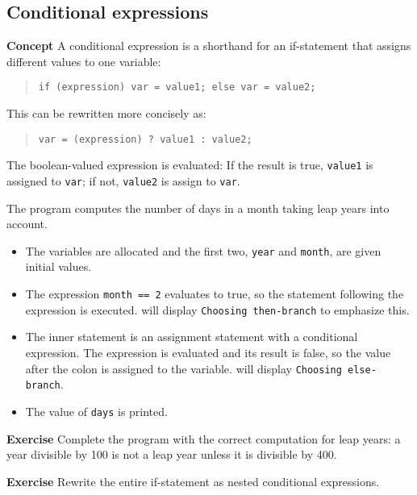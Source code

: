 \subsection{Conditional expressions}\label{control.02}

\textbf{Concept} A conditional expression is a shorthand for an if-statement that
assigns different values to one variable:
\begin{quote}
\texttt{if (expression) var = value1; else var = value2;}
\end{quote}
This can be rewritten more concisely as:
\begin{quote}
\texttt{var = (expression) ? value1 : value2;}
\end{quote}
The boolean-valued expression is evaluated:  
If the result is true, \texttt{value1} is assigned to \texttt{var}; if not, \texttt{value2} is assign to \texttt{var}.


The program computes the number of days in a month taking leap years into account.

\begin{itemize}
\item The variables are allocated and the first two, \texttt{year} and \texttt{month}, are
given initial values.
\item The expression \texttt{month == 2} evaluates to true, so the statement
following the expression is executed. \jel{} will display \texttt{Choosing then-branch} to 
emphasize this.
\item The inner statement is an assignment statement with a conditional expression.
The expression is evaluated
and its result is false, so the value after the colon is assigned to the variable.
\jel{} will display \texttt{Choosing else-branch}.
\item The value of \texttt{days} is printed.
\end{itemize}

\textbf{Exercise} Complete the program with the correct computation
for leap years: a year divisible by 100 is not a leap year unless it
is divisible by 400.

\textbf{Exercise} Rewrite the entire if-statement as nested conditional expressions.
